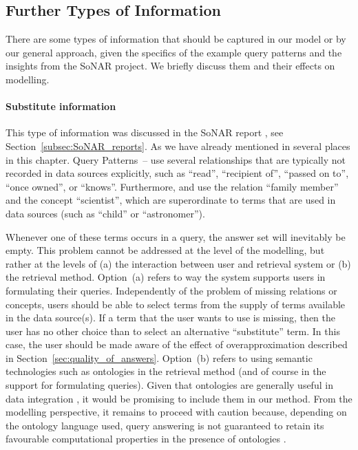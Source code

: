 \subsection{Further Types of Information}
\label{subsec:further_information}

There are some types of information that should be captured in our model
or by our general approach,
given the specifics of the example query patterns
and the insights from the SoNAR project.
We briefly discuss them and their effects on modelling.

\paragraph{Substitute information}

This type of information was discussed
in the SoNAR report \autocite{Fangerau2022}, see Section~\ref{subsec:SoNAR_reports}.
As we have already mentioned in several places in this chapter.
Query Patterns~-- use several relationships
that are typically not recorded in data sources explicitly, such as
\enquote{read}, \enquote{recipient of}, \enquote{passed on to},
\enquote{once owned}, or \enquote{knows}.
Furthermore,  and 
use the relation \enquote{family member} and the concept \enquote{scientist},
which are superordinate to terms that are used in data sources
(such as \enquote{child} or \enquote{astronomer}).

Whenever one of these terms occurs in a query,
the answer set will inevitably be empty.
This problem cannot be addressed at the level of the modelling,
but rather at the levels of (a) the interaction between user and retrieval system
or (b) the retrieval method.
Option~(a) refers to way the system supports users in formulating their queries.
Independently of the problem of missing relations or concepts, users should be able to 
select terms from the supply of terms available in the data source(s).
If a term that the user wants to use is missing, then the user has no other choice than
to select an alternative \enquote{substitute} term.
In this case, the user should be made aware of the effect of overapproximation
described in Section~\ref{sec:quality_of_answers}.
Option~(b) refers to using semantic technologies such as ontologies
in the retrieval method (and of course in the support for formulating queries).
Given that ontologies are generally useful in data integration \autocite[§12]{Doan2012},
it would be promising to include them in our method.
From the modelling perspective, it remains to proceed with caution
because, depending on the ontology language used,
query answering is not guaranteed to retain its favourable computational properties
in the presence of ontologies \autocite{Lutz2016,Xiao2018,Barcelo2019}.

